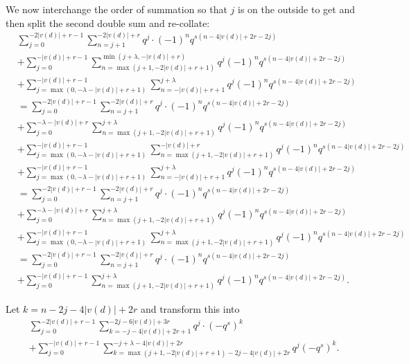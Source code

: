 We now interchange the order of summation so that $j$ is on the outside to get
and then split the second double sum and re-collate:
\begin{align*}
  &\sum_{j=0}^{-2|v(d)|+r-1}
    \sum_{n=j+1}^{-2|v(d)|+r}
    q^j \cdot (-1)^n q^{s(n-4|v(d)|+2r-2j)} \\
  &+ \sum_{j=0}^{-|v(d)|+r-1}
    \sum_{n=\max(j+1, -2|v(d)|+r+1)}^{\min(j+\lambda,-|v(d)|+r)}
    q^j (-1)^n q^{s(n-4|v(d)|+2r-2j)} \\
  &+ \sum_{j=\max(0, -\lambda-|v(d)|+r+1)}^{-|v(d)|+r-1}
    \sum_{n=-|v(d)|+r+1}^{j+\lambda}
    q^j (-1)^n q^{s(n-4|v(d)|+2r-2j)} \\
  &= \sum_{j=0}^{-2|v(d)|+r-1}
    \sum_{n=j+1}^{-2|v(d)|+r}
    q^j \cdot (-1)^n q^{s(n-4|v(d)|+2r-2j)} \\
  &+ \sum_{j=0}^{-\lambda-|v(d)|+r}
    \sum_{n=\max(j+1, -2|v(d)|+r+1)}^{j+\lambda}
    q^j (-1)^n q^{s(n-4|v(d)|+2r-2j)} \\
  &+ \sum_{j=\max(0, -\lambda-|v(d)|+r+1)}^{-|v(d)|+r-1}
    \sum_{n=\max(j+1, -2|v(d)|+r+1)}^{-|v(d)|+r}
    q^j (-1)^n q^{s(n-4|v(d)|+2r-2j)} \\
  &+ \sum_{j=\max(0, -\lambda-|v(d)|+r+1)}^{-|v(d)|+r-1}
    \sum_{n=-|v(d)|+r+1}^{j+\lambda}
    q^j (-1)^n q^{s(n-4|v(d)|+2r-2j)} \\
  &= \sum_{j=0}^{-2|v(d)|+r-1}
    \sum_{n=j+1}^{-2|v(d)|+r}
    q^j \cdot (-1)^n q^{s(n-4|v(d)|+2r-2j)} \\
  &+ \sum_{j=0}^{-\lambda-|v(d)|+r}
    \sum_{n=\max(j+1, -2|v(d)|+r+1)}^{j+\lambda}
    q^j (-1)^n q^{s(n-4|v(d)|+2r-2j)} \\
  &+ \sum_{j=\max(0, -\lambda-|v(d)|+r+1)}^{-|v(d)|+r-1}
    \sum_{n=\max(j+1, -2|v(d)|+r+1)}^{j+\lambda}
    q^j (-1)^n q^{s(n-4|v(d)|+2r-2j)} \\
  &= \sum_{j=0}^{-2|v(d)|+r-1}
    \sum_{n=j+1}^{-2|v(d)|+r}
    q^j \cdot (-1)^n q^{s(n-4|v(d)|+2r-2j)} \\
  &+ \sum_{j=0}^{-|v(d)|+r-1}
    \sum_{n=\max(j+1, -2|v(d)|+r+1)}^{j+\lambda}
    q^j (-1)^n q^{s(n-4|v(d)|+2r-2j)}.
\end{align*}

Let $k = n - 2j - 4|v(d)| + 2r$ and transform this into
\begin{align*}
  &\sum_{j=0}^{-2|v(d)|+r-1}
    \sum_{k=-j-4|v(d)|+2r+1}^{-2j-6|v(d)|+3r}
    q^j \cdot (-q^s)^k \\
  &+ \sum_{j=0}^{-|v(d)|+r-1}
    \sum_{k=\max(j+1, -2|v(d)|+r+1) - 2j - 4|v(d)| + 2r}^{-j+\lambda-4|v(d)|+2r}
    q^j (-q^s)^k.
\end{align*}

